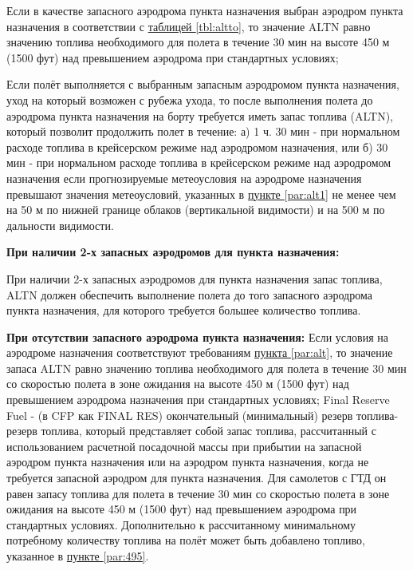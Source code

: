 Если в качестве запасного аэродрома пункта назначения выбран аэродром пункта назначения в соответствии с \hyperref[tbl:altto]{таблицей \ref*{tbl:altto}}, то значение ALTN равно значению топлива необходимого для полета в течение 30 мин на высоте 450 м (1500 фут) над превышением аэродрома при стандартных условиях; 

Если полёт выполняется с выбранным запасным аэродромом пункта назначения, уход на который возможен с рубежа ухода, то после выполнения полета до аэродрома пункта назначения на борту требуется иметь запас топлива (ALTN), который позволит продолжить полет в течение: 
а)	1 ч. 30 мин - при нормальном расходе топлива в крейсерском режиме над аэродромом назначения, или 
б)	30 мин - при нормальном расходе топлива в крейсерском режиме над аэродромом назначения если прогнозируемые метеоусловия на аэродроме назначения превышают значения метеоусловий, указанных в \hyperref[par:alt1]{пункте \ref*{par:alt1}} не менее чем на 50 м по нижней границе облаков (вертикальной видимости) и на 500 м по дальности видимости. 

\textbf{При наличии 2-х запасных аэродромов для пункта назначения:} 

При наличии 2-х запасных аэродромов для пункта назначения запас топлива, ALTN должен обеспечить выполнение полета до того запасного аэродрома пункта назначения, для которого требуется большее количество топлива. 

\textbf{При отсутствии запасного аэродрома пункта назначения:} 
Если условия на аэродроме назначения соответствуют требованиям \hyperref[par:alt]{пункта \ref*{par:alt}}, то значение запаса ALTN равно значению топлива необходимого для полета в течение 30 мин со скоростью полета в зоне ожидания на высоте 450 м (1500 фут) над превышением аэродрома назначения при стандартных условиях;
Final Reserve Fuel - (в CFP как FINAL RES) окончательный (минимальный) резерв топлива- резерв топлива, который представляет собой запас топлива, рассчитанный с использованием расчетной посадочной массы при прибытии на запасной аэродром пункта назначения или на аэродром пункта назначения, когда не требуется запасной аэродром для пункта назначения. Для самолетов с ГТД он равен запасу топлива для полета в течение 30 мин со скоростью полета в зоне ожидания на высоте 450 м (1500 фут) над превышением аэродрома при стандартных условиях.
Дополнительно к рассчитанному минимальному потребному количеству топлива на полёт может быть добавлено топливо, указанное в \hyperref[par:495]{пункте \ref*{par:495}}.


